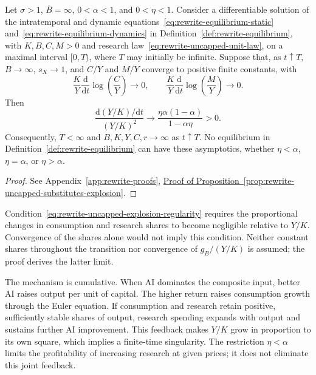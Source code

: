 \begin{proposition}
\label{prop:rewrite-uncapped-substitutes-explosion}
Let $\sigma>1$, $\overline B=\infty$, $0<\alpha<1$, and $0<\eta<1$.
Consider a differentiable solution of the intratemporal and dynamic
equations~\eqref{eq:rewrite-equilibrium-static} and~\eqref{eq:rewrite-equilibrium-dynamics}
in Definition~\ref{def:rewrite-equilibrium}, with $K,B,C,M>0$ and research
law~\eqref{eq:rewrite-uncapped-unit-law}, on a maximal interval $[0,T)$,
where $T$ may initially be infinite.
Suppose that, as $t\uparrow T$, $B\to\infty$, $s_X\to1$, and $C/Y$ and
$M/Y$ converge to positive finite constants, with
\begin{equation}
 \frac K Y\frac{\mathrm d}{\mathrm dt}\log\left(\frac C Y\right)\to0,
 \qquad
 \frac K Y\frac{\mathrm d}{\mathrm dt}\log\left(\frac M Y\right)\to0.
 \label{eq:rewrite-uncapped-explosion-regularity}
\end{equation}
Then
\begin{equation}
 \frac{\mathrm d(Y/K)/\mathrm dt}{(Y/K)^2}
 \longrightarrow\frac{\eta\alpha(1-\alpha)}{1-\alpha\eta}>0.
 \label{eq:rewrite-uncapped-explosion-coefficient}
\end{equation}
Consequently, $T<\infty$ and $B,K,Y,C,r\to\infty$ as $t\uparrow T$.
No equilibrium in Definition~\ref{def:rewrite-equilibrium} can have these
asymptotics, whether $\eta<\alpha$, $\eta=\alpha$, or $\eta>\alpha$.
\end{proposition}
\begin{proof}
See Appendix~\ref{app:rewrite-proofs},
\hyperref[proof:rewrite-uncapped-substitutes-explosion]{Proof of
Proposition~\ref*{prop:rewrite-uncapped-substitutes-explosion}}.
\end{proof}

Condition~\eqref{eq:rewrite-uncapped-explosion-regularity} requires the
proportional changes in consumption and research shares to become negligible
relative to $Y/K$. Convergence of the shares alone would not imply this
condition. Neither constant shares throughout the transition nor convergence
of $g_B/(Y/K)$ is assumed; the proof derives the latter limit.

The mechanism is cumulative. When AI dominates the composite input, better AI
raises output per unit of capital. The higher return raises consumption
growth through the Euler equation. If consumption and research retain
positive, sufficiently stable shares of output, research spending expands
with output and sustains further AI improvement. This feedback makes $Y/K$
grow in proportion to its own square, which implies a finite-time singularity.
The restriction $\eta<\alpha$ limits the profitability of increasing research
at given prices; it does not eliminate this joint feedback.

